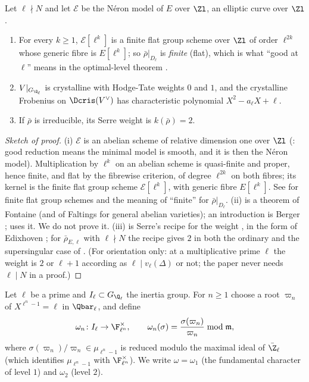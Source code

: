 \begin{theorem}\label{thm:galrep:good-at-l}
Let $\ell\nmid N$ and let $\mathcal E$ be the N\'eron model of $E$ over $\Zl$, an elliptic curve over $\Zl$.
\begin{enumerate}[label=(\roman*)]
\item For every $k\ge1$, $\mathcal E[\ell^k]$ is a finite flat group scheme over $\Zl$ of order $\ell^{2k}$ whose generic fibre is $E[\ell^k]$; so $\bar\rho|_{D_\ell}$ is
\emph{finite} (flat), which is what ``good at $\ell$'' means in the optimal-level theorem \cite[Theorem 3.15]{DDT}.
\item $V|_{G_{\Q_\ell}}$ is crystalline with Hodge-Tate weights $0$ and $1$, and the crystalline Frobenius on $\Dcris(V^\vee)$ has characteristic polynomial
$X^2-a_\ell X+\ell$.
\item If $\bar\rho$ is irreducible, its Serre weight is $k(\bar\rho)=2$.
\end{enumerate}
\end{theorem}

\begin{proof}[Sketch of proof]
(i) $\mathcal E$ is an abelian scheme of relative dimension one over $\Zl$ (: good reduction means the minimal model is smooth,
and it is then the N\'eron model). Multiplication by $\ell^k$ on an abelian scheme is quasi-finite and proper, hence finite, and flat by the
fibrewise criterion, of degree $\ell^{2k}$ on both fibres; its kernel is the finite flat group scheme $\mathcal E[\ell^k]$, with generic fibre $E[\ell^k]$. See
\cite[Section 2]{DDT} for finite flat group schemes and the meaning of ``finite'' for $\bar\rho|_{D_\ell}$. (ii) is a theorem of Fontaine (and of
Faltings for general abelian varieties); an introduction is Berger \cite{Berger};  uses it. We do not prove it. (iii) is
Serre's recipe for the weight \cite[Section 2]{Serre87}, in the form of Edixhoven \cite[Section 2]{Edixhoven92}; for $\bar\rho_{E,\ell}$ with $\ell\nmid N$ the
recipe gives $2$ in both the ordinary and the supersingular case of . (For orientation only: at a
multiplicative prime $\ell$ the weight is $2$ or $\ell+1$ according as $\ell\mid v_\ell(\Delta)$ or not; the paper never needs $\ell\mid N$ in a proof.)
\end{proof}

\begin{definition}\label{def:galrep:fundamental-characters}
Let $\ell$ be a prime and $I_\ell\subset G_{\Q_\ell}$ the inertia group. For $n\ge1$ choose a root $\varpi_n$ of $X^{\ell^n-1}=\ell$ in $\Qbar_\ell$, and define
\[
\omega_n\colon I_\ell\to\F_{\ell^n}^\times,\qquad\omega_n(\sigma)=\frac{\sigma(\varpi_n)}{\varpi_n}\bmod\mathfrak m,
\]
where $\sigma(\varpi_n)/\varpi_n\in\mu_{\ell^n-1}$ is reduced modulo the maximal ideal of $\bar\Z_\ell$ (which identifies $\mu_{\ell^n-1}$ with $\F_{\ell^n}^\times$). We
write $\omega=\omega_1$ (the fundamental character of level $1$) and $\omega_2$ (level $2$).
\end{definition}

